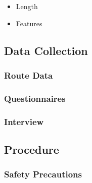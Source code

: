 \begin{itemize}
    \item Length
    \item Features
\end{itemize}

\subsection{Data Collection}

\subsubsection{Route Data}

\subsubsection{Questionnaires}

\subsubsection{Interview}

\subsection{Procedure}

\subsubsection{Safety Precautions}
